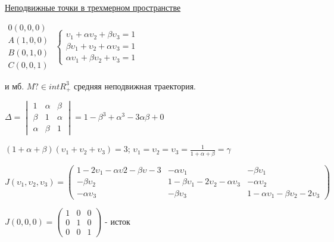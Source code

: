 \vspace{0.5cm}
{\underline{Неподвижные точки в трехмерном пространстве}}

\vspace{0.5cm}
\(
 \begin{matrix}
 0(0,0,0)\\
 A(1,0,0)\\
 B(0,1,0)\\
 C(0,0,1)
 \end{matrix}
\)\hspace{2cm}
\(
 \begin{cases}
 	\upsilon_1 + \alpha\upsilon_2 + \beta\upsilon_3 = 1
 	\\
 	\beta\upsilon_1 + \upsilon_2 + \alpha\upsilon_3 = 1
 	\\
 	\alpha\upsilon_1 + \beta\upsilon_2 + \upsilon_3 = 1
 \end{cases}
\)

\vspace{0.5cm}
и мб. \(M ? \in intR_+^3\) средняя неподвижная траектория.

\vspace{0.5cm}
\(
	\Delta = 
	\begin{vmatrix}
	1 & \alpha & \beta \\ 
	\beta & 1 & \alpha \\
	\alpha & \beta & 1
	\end{vmatrix}
	= 1 - \beta^3 + \alpha^3 - 3\alpha\beta + 0
\)

\vspace{0.5cm}
\((1 + \alpha + \beta)(\upsilon_1 + \upsilon_2 + \upsilon_3) = 3 \);\hspace{0.5cm}
\(\upsilon_1 = \upsilon_2 = \upsilon_3 = \frac{1}{1 + \alpha + \beta} = \gamma \)

\vspace{0.5cm}
\(
J (\upsilon_1,\upsilon_2,\upsilon_3) = 
	\begin{pmatrix}
		1 - 2\upsilon_1 - \alpha\upsilon2 - \beta\upsilon-3 & -\alpha\upsilon_1 & -\beta\upsilon_1 \\
		-\beta\upsilon_2 & 1 - \beta\upsilon_1 - 2\upsilon_2 - \alpha\upsilon_3 & -\alpha\upsilon_2\\
		-\alpha\upsilon_3 & -\beta\upsilon_3 & 1 - \alpha\upsilon_1 - \beta\upsilon_2 - 2\upsilon_3
	\end{pmatrix}
\)

\vspace{0.5cm}
\(
J(0,0,0) = 
	\begin{pmatrix}
		1 & 0 & 0\\
		0 & 1 & 0\\
		0 & 0 & 1
	\end{pmatrix}
\)
\hspace{0.2cm} - исток

